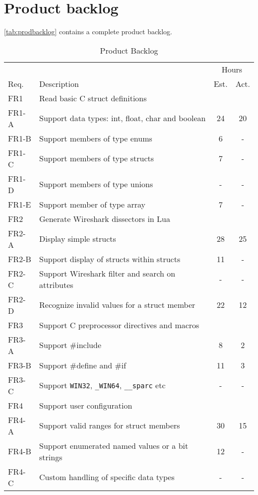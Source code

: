 \section{Product backlog}
\label{sec:prodbacklog}
\autoref{tab:prodbacklog} contains a complete product backlog.

\begin{table}[ht] \small \center
\caption{Product Backlog \label{tab:prodbacklog}}
\begin{tabularx}{\textwidth}{l X c c}
	\toprule
	& & \multicolumn{2}{c}{Hours} \\
	\cmidrule(r){3-4}
	Req. & Description & Est. & Act. \\
	\midrule
	FR1 & Read basic C struct definitions & & \\
	FR1-A & Support data types: int, float, char and boolean & 24 & 20 \\
	FR1-B & Support members of type enums & 6 & - \\
	FR1-C & Support members of type structs & 7 & - \\
	FR1-D & Support members of type unions & - & - \\
	FR1-E & Support member of type array & 7 & - \\
	\addlinespace
	FR2 & Generate Wireshark dissectors in Lua & & \\
	FR2-A & Display simple structs & 28 & 25 \\
	FR2-B & Support display of structs within structs & 11 & - \\
	FR2-C & Support Wireshark filter and search on attributes & - & - \\
	FR2-D & Recognize invalid values for a struct member & 22 & 12 \\
	\addlinespace
	FR3 & Support C preprocessor directives and macros & & \\
	FR3-A & Support \#include & 8 & 2 \\
	FR3-B & Support \#define and \#if & 11 & 3 \\
	FR3-C & Support \verb+WIN32+, \verb+_WIN64+, \verb+__sparc+ etc & - & - \\
	\addlinespace
	FR4 & Support user configuration & & \\
	FR4-A & Support valid ranges for struct members & 30 & 15 \\
	FR4-B & Support enumerated named values or a bit strings & 12 & - \\
	FR4-C & Custom handling of specific data types & - & - \\

\end{tabularx}
\end{table}
